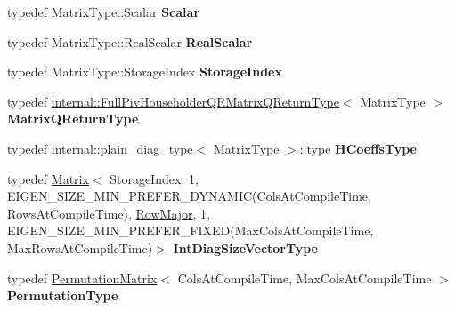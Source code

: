 \begin{DoxyCompactItemize}
\item 
\mbox{\label{group___q_r___module_a30eb2e756bcd1c1148142a3a0deb6f88}} 
typedef Matrix\+Type\+::\+Scalar {\bfseries Scalar}
\item 
\mbox{\label{group___q_r___module_a22c6a854a83225617e56c03cbdbc94c3}} 
typedef Matrix\+Type\+::\+Real\+Scalar {\bfseries Real\+Scalar}
\item 
\mbox{\label{group___q_r___module_a55934e8ed065b629ca86382863fc66b0}} 
typedef Matrix\+Type\+::\+Storage\+Index {\bfseries Storage\+Index}
\item 
\mbox{\label{group___q_r___module_aca49f0aada2187c4b37b59211188a267}} 
typedef \hyperlink{group___q_r___module_struct_eigen_1_1internal_1_1_full_piv_householder_q_r_matrix_q_return_type}{internal\+::\+Full\+Piv\+Householder\+Q\+R\+Matrix\+Q\+Return\+Type}$<$ Matrix\+Type $>$ {\bfseries Matrix\+Q\+Return\+Type}
\item 
\mbox{\label{group___q_r___module_ace3d0a40673c063c78035548c4259806}} 
typedef \hyperlink{struct_eigen_1_1internal_1_1plain__diag__type}{internal\+::plain\+\_\+diag\+\_\+type}$<$ Matrix\+Type $>$\+::type {\bfseries H\+Coeffs\+Type}
\item 
\mbox{\label{group___q_r___module_a79d964192e828e7cc2910f219df4b2dc}} 
typedef \hyperlink{group___core___module_class_eigen_1_1_matrix}{Matrix}$<$ Storage\+Index, 1, E\+I\+G\+E\+N\+\_\+\+S\+I\+Z\+E\+\_\+\+M\+I\+N\+\_\+\+P\+R\+E\+F\+E\+R\+\_\+\+D\+Y\+N\+A\+M\+IC(Cols\+At\+Compile\+Time, Rows\+At\+Compile\+Time), \hyperlink{group__enums_ggaacded1a18ae58b0f554751f6cdf9eb13acfcde9cd8677c5f7caf6bd603666aae3}{Row\+Major}, 1, E\+I\+G\+E\+N\+\_\+\+S\+I\+Z\+E\+\_\+\+M\+I\+N\+\_\+\+P\+R\+E\+F\+E\+R\+\_\+\+F\+I\+X\+ED(Max\+Cols\+At\+Compile\+Time, Max\+Rows\+At\+Compile\+Time)$>$ {\bfseries Int\+Diag\+Size\+Vector\+Type}
\item 
\mbox{\label{group___q_r___module_a29ba3c0d3d7ceb8558c6cba4b5afba89}} 
typedef \hyperlink{group___core___module_class_eigen_1_1_permutation_matrix}{Permutation\+Matrix}$<$ Cols\+At\+Compile\+Time, Max\+Cols\+At\+Compile\+Time $>$ {\bfseries Permutation\+Type}

\end{DoxyCompactItemize}
